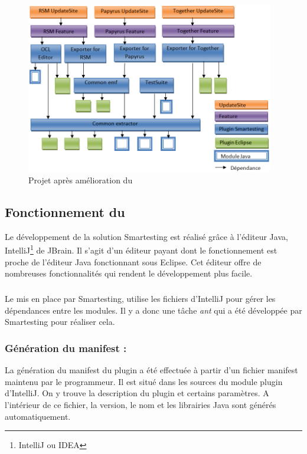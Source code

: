 \begin{figure}[!h]
\begin{center}
  \includegraphics[height=7.5cm]{images/AmeliorationBuild.png}
  \caption{Projet après amélioration du \build}
  \label{AmeliorationBuild}
\end{center}
\end{figure}

\subsection{Fonctionnement du \build}

Le développement de la solution Smartesting est réalisé grâce à l'éditeur Java, IntelliJ\footnote{IntelliJ ou IDEA} de JBrain.
Il s'agit d'un éditeur payant dont le fonctionnement est proche de l'éditeur Java fonctionnant sous Eclipse.
Cet éditeur offre de nombreuses fonctionnalités qui rendent le développement plus facile.

\subparagraph*{}
Le \build mis en place par Smartesting, utilise les fichiers d'IntelliJ pour gérer les dépendances entre les modules.
Il y a donc une tâche \textit{ant} qui a été développée par Smartesting pour réaliser cela.

\subsubsection{Génération du manifest :}

La génération du manifest du plugin a été effectuée à partir d'un fichier manifest maintenu par le programmeur. 
Il est situé dans les sources du module plugin d'IntelliJ.
On y trouve la description du plugin et certains paramètres.
A l'intérieur de ce fichier, la version, le nom et les librairies Java sont générés automatiquement.

